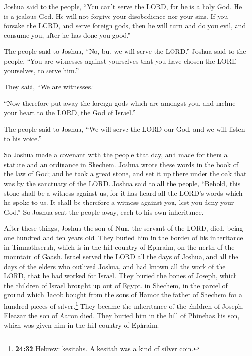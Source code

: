  Joshua said to the people, ``You can't serve the LORD,
for he is a holy God. He is a jealous God. He will not forgive your
disobedience nor your sins.  If you forsake the LORD, and
serve foreign gods, then he will turn and do you evil, and consume you,
after he has done you good.''

 The people said to Joshua, ``No, but we will serve the
LORD.''  Joshua said to the people, ``You are witnesses
against yourselves that you have chosen the LORD yourselves, to serve
him.''

They said, ``We are witnesses.''

 ``Now therefore put away the foreign gods which are
amongst you, and incline your heart to the LORD, the God of Israel.''

 The people said to Joshua, ``We will serve the LORD our
God, and we will listen to his voice.''

 So Joshua made a covenant with the people that day, and
made for them a statute and an ordinance in Shechem. 
Joshua wrote these words in the book of the law of God; and he took a
great stone, and set it up there under the oak that was by the sanctuary
of the LORD.  Joshua said to all the people, ``Behold,
this stone shall be a witness against us, for it has heard all the
LORD's words which he spoke to us. It shall be therefore a witness
against you, lest you deny your God.''  So Joshua sent
the people away, each to his own inheritance.

 After these things, Joshua the son of Nun, the servant
of the LORD, died, being one hundred and ten years old. 
They buried him in the border of his inheritance in Timnathserah, which
is in the hill country of Ephraim, on the north of the mountain of
Gaash.  Israel served the LORD all the days of Joshua,
and all the days of the elders who outlived Joshua, and had known all
the work of the LORD, that he had worked for Israel. 
They buried the bones of Joseph, which the children of Israel brought up
out of Egypt, in Shechem, in the parcel of ground which Jacob bought
from the sons of Hamor the father of Shechem for a hundred pieces of
silver.\footnote{\textbf{24:32} Hebrew: kesitahs. A kesitah was a kind
  of silver coin.} They became the inheritance of the children of
Joseph.  Eleazar the son of Aaron died. They buried him
in the hill of Phinehas his son, which was given him in the hill country
of Ephraim.
